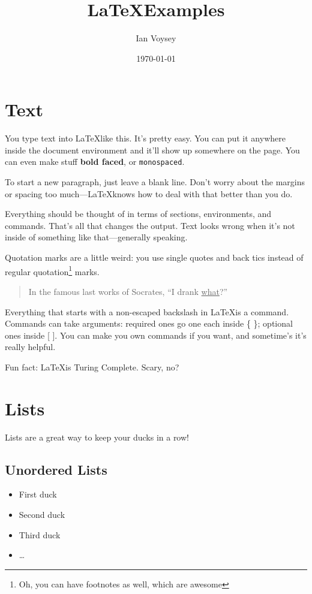 \documentclass{article}
\author{Ian Voysey}
\title{\LaTeX Examples}
\date{\today}
\begin{document}
\maketitle
\section{Text}
\label{sec:text}
You type text into \LaTeX like this. It's pretty easy. You can put it anywhere
inside the document environment and it'll show up somewhere on the page. You
can even make stuff \textbf{bold faced}, or \texttt{monospaced}.

To start a new paragraph, just leave a blank line. Don't worry about the
margins or spacing too much---\LaTeX knows how to deal with that better than
you do.

Everything should be thought of in terms of sections, environments, and
commands. That's all that changes the output. Text looks wrong when it's not
inside of something like that---generally speaking.

Quotation marks are a little weird: you use single quotes and back tics
instead of regular quotation\footnote{Oh, you can have footnotes as well,
  which are awesome} marks.
\begin{quote}
  In the famous last works of Socrates, ``I drank \uline{what}?''
\end{quote}

Everything that starts with a non-escaped backslash in \LaTeX is a
command. Commands can take arguments: required ones go one each inside \{ \};
optional ones inside [ ]. You can make you own commands if you want, and
sometime's it's really helpful.

Fun fact: \LaTeX is Turing Complete. Scary, no?

\section{Lists}
Lists are a great way to keep your ducks in a row!

\subsection{Unordered Lists}
\begin{itemize}
  \item First duck
  \item Second duck
  \item Third duck
  \item \ldots
\end{itemize}
\end{document}
